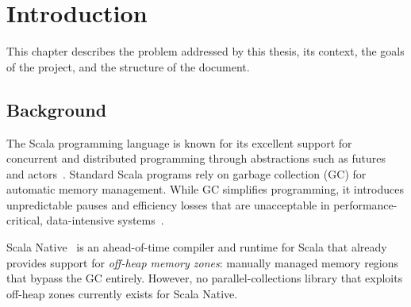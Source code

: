 \documentclass[
  english,   %
  bibtex,    %
]{kththesis}
\begin{document}
\renewcommand{\chaptermark}[1]{\markboth{#1}{}}
\tableofcontents
  \markboth{\contentsname}{}

\cleardoublepage
\listoffigures
\cleardoublepage
\listoftables
\cleardoublepage

\printglossary[style=mylong, type=\acronymtype, title={List of acronyms and abbreviations}]

\label{pg:lastPageofPreface}

\mainmatter
\glsresetall
\renewcommand{\chaptermark}[1]{\markboth{#1}{}}

\chapter{Introduction}
\label{ch:introduction}

This chapter describes the problem addressed by this thesis, its context,
the goals of the project, and the structure of the document.

\section{Background}
\label{sec:background}

The Scala programming language is known for its excellent support for
concurrent and distributed programming through abstractions such as futures
and actors~\cite{haller_scala_actors}.  Standard Scala programs rely on
garbage collection (\gls{GC}) for automatic memory management.  While GC
simplifies programming, it introduces unpredictable pauses and efficiency
losses that are unacceptable in performance-critical, data-intensive
systems~\cite{gog_broom_2015}.

Scala Native~\cite{scala_native} is an ahead-of-time compiler and runtime
for Scala that already provides support for \textit{off-heap memory zones}:
manually managed memory regions that bypass the \gls{GC} entirely.  However,
no parallel-collections library that exploits off-heap zones currently exists
for Scala Native.
\end{document}
